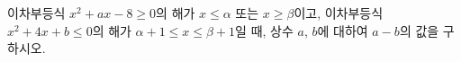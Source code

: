 이차부등식 $x^2+ax-8\ge 0$의 해가 $x\le\alpha$ 또는 $x\ge\beta$이고, 이차부등식 $x^2+4x+b\le 0$의 해가 $\alpha+1\le x\le\beta+1$일 때, 상수 $a$, $b$에 대하여 $a-b$의 값을 구하시오. \cond{$\alpha<\beta$}
